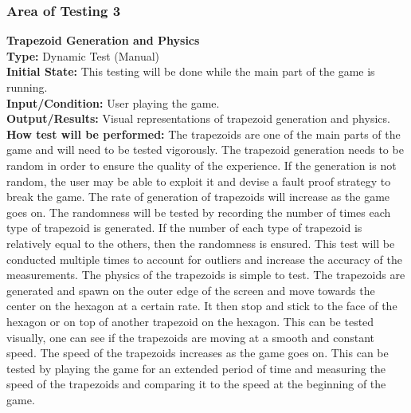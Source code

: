 \documentclass[12pt, titlepage]{article}
\begin{document}
\subsubsection{Area of Testing 3}
\noindent \textbf{Trapezoid Generation and Physics} \\
\textbf{Type:} Dynamic Test (Manual)\\
\textbf{Initial State:} This testing will be done while the main part of the game is running.\\
\textbf{Input/Condition:} User playing the game.\\
\textbf{Output/Results:} Visual representations of trapezoid generation and physics.\\
\textbf{How test will be performed:} The trapezoids are one of the main parts of the game and will need to be tested vigorously. The trapezoid generation needs to be random in order to ensure the quality of the experience. If the generation is not random, the user may be able to exploit it and devise a fault proof strategy to break the game. The rate of generation of trapezoids will increase as the game goes on. The randomness will be tested by recording the number of times each type of trapezoid is generated. If the number of each type of trapezoid is relatively equal to the others, then the randomness is ensured. This test will be conducted multiple times to account for outliers and increase the accuracy of the measurements. The physics of the trapezoids is simple to test. The trapezoids are generated and spawn on the outer edge of the screen and move towards the center on the hexagon at a certain rate. It then stop and stick to the face of the hexagon or on top of another trapezoid on the hexagon. This can be tested visually, one can see if the trapezoids are moving at a smooth and constant speed. The speed of the trapezoids increases as the game goes on. This can be tested by playing the game for an extended period of time and measuring the speed of the trapezoids and comparing it to the speed at the beginning of the game.
\end{document}
